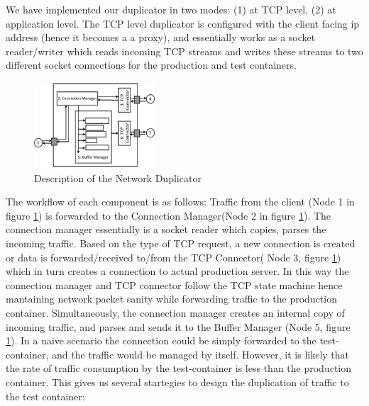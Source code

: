We have implemented our duplicator in two modes: (1) at TCP level, (2) at application level.
The TCP level duplicator is configured with the client facing ip address (hence it becomes  a a proxy), and essentially works as a socket reader/writer which reads incoming TCP streams and writes these streams to two different socket connections for the production and test containers.

\begin{figure}[t]
  \begin{center}
    \includegraphics[width=0.4\textwidth]{figs/duplicator.eps}
    \caption{Description of the Network Duplicator}
    \label{fig:duplicator}
  \end{center}
\end{figure}

The workflow of each component is as follows: Traffic from the client (Node 1 in figure \ref{fig:duplicator}) is forwarded to the Connection Manager(Node 2 in figure \ref{fig:duplicator}). 
The connection manager essentially is a socket reader which copies, parses the incoming traffic. 
Based on the type of TCP request, a new connection is created or data is forwarded/received to/from the TCP Connector( Node 3, figure \ref{fig:duplicator}) which in turn creates a connection to actual production server.
In this way the connection manager and TCP connector follow the TCP state machine hence mantaining network packet sanity while forwarding traffic to the production container.
Simultaneously, the connection manager creates an internal copy of incoming traffic, and parses and sends it to the Buffer Manager (Node 5, figure \ref{fig:duplicator}).
In a naive scenario the connection could be simply forwarded to the test-container, and the traffic would be managed by itself. 
However, it is likely that the rate of traffic consumption by the test-container is less than the production container. 
This gives us several startegies to design the duplication of traffic to the test container:

